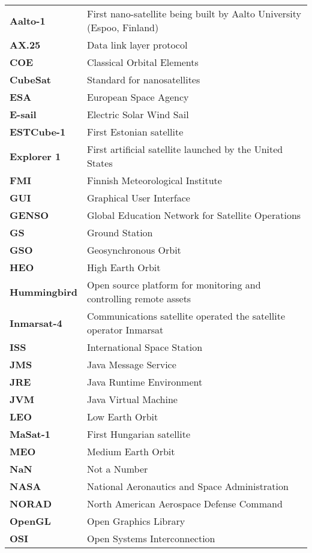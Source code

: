 \begin{tabular}{l@{\extracolsep{1.4cm}}l}
\textbf{Aalto-1} & First nano-satellite being built by Aalto University (Espoo, Finland)\\
\textbf{AX.25}   & Data link layer protocol\\
\textbf{COE} 	 & Classical Orbital Elements\\
\textbf{CubeSat} & Standard for nanosatellites\\
\textbf{ESA} & European Space Agency\\
\textbf{E-sail} & Electric Solar Wind Sail\\
\textbf{ESTCube-1} & First Estonian satellite\\
\textbf{Explorer 1} & First artificial satellite launched by the United States\\
\textbf{FMI} & Finnish Meteorological Institute\\
\textbf{GUI} & Graphical User Interface\\
\textbf{GENSO} & Global Education Network for Satellite Operations\\
\textbf{GS}      & Ground Station\\
\textbf{GSO} &Geosynchronous Orbit\\
\textbf{HEO} &High Earth Orbit\\
\textbf{Hummingbird} &Open source platform for monitoring and controlling remote assets\\
\textbf{Inmarsat-4} & Communications satellite operated the satellite operator Inmarsat\\
\textbf{ISS}     & International Space Station\\
\textbf{JMS} &Java Message Service\\
\textbf{JRE} &Java Runtime Environment\\
\textbf{JVM} &Java Virtual Machine\\
\textbf{LEO}     & Low Earth Orbit\\
\textbf{MaSat-1}     & First Hungarian satellite\\
\textbf{MEO}     & Medium Earth Orbit\\
\textbf{NaN}		&Not a Number\\
\textbf{NASA}    & National Aeronautics and Space Administration\\
\textbf{NORAD}   & North American Aerospace Defense Command\\
\textbf{OpenGL}  & Open Graphics Library\\ 	
\textbf{OSI}     & Open Systems Interconnection\\

\end{tabular}
